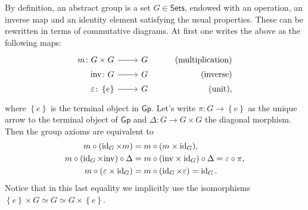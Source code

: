 \begin{rem}[]
	By definition, an abstract group is a set $G \in \mathsf{Sets}$, endowed with an operation,
	an inverse map and an identity element satisfying the usual properties.
	These can be rewritten in terms of commutative diagrams.
	At first one writes the above as the following maps:
	\begin{equation*}
	\begin{tikzcd}[row sep = 0ex
         ,/tikz/column 1/.append style={anchor=base east}
         ,/tikz/column 2/.append style={anchor=base west}
         ,/tikz/column 3/.append style={anchor=base east}]
			m\colon G \times G \arrow[r, "", rightarrow] &
			G & \text{(multiplication)} \\
			\mathrm{inv}\colon G \arrow[r, "", rightarrow] &
			G & \text{(inverse)} \\
			\varepsilon \colon \left\{ e \right\} \arrow[r, "", rightarrow] &
			G & \text{(unit),}
		\end{tikzcd}
	\end{equation*} 
	where $\left\{ e \right\}$ is the terminal object in $\mathsf{Gp}$.
	Let's write $\pi\colon G \to \left\{ e \right\}$
	as the unique arrow to the terminal object of $\mathsf{Gp}$
	and $\Delta\colon G \to G \times G$ the diagonal morphism.
	Then the group axioms are equivalent to
	\begin{align}\label{eq:GroupAxioms}
		m \circ (\operatorname{id}_{ G } \times m) &= m \circ (m \times \operatorname{id}_{ G }),\nonumber\\
		m \circ (\operatorname{id}_{ G } \times \mathrm{inv}) \circ \Delta &=
		m \circ (\mathrm{inv} \times \operatorname{id}_{ G }) \circ \Delta = \varepsilon \circ \pi,\\
		m \circ (\varepsilon \times \operatorname{id}_{ G }) &=
		m \circ (\operatorname{id}_{ G } \times \varepsilon) = \operatorname{id}_{ G }\nonumber
	.\end{align} 
	Notice that in this last equality we implicitly use the isomorphisms
	$\left\{ e \right\} \times G \simeq G \simeq G \times \left\{ e \right\}$.
\end{rem}


